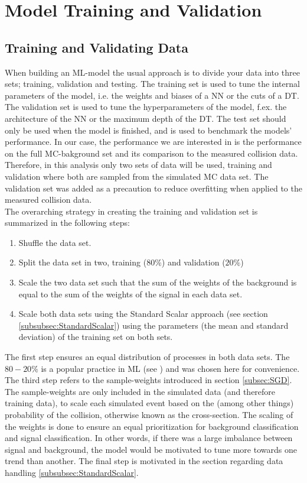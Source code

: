\newpage
\section{Model Training and Validation}
\subsection{Training and Validating Data}\label{subsec:TraVal}
When building an \ac{ML}-model the usual approach is to divide your data into three sets; training, validation and 
testing. The training set is used to tune the internal parameters of the model, i.e. the weights and biases of a \ac{NN} or the cuts of a \ac{DT}.
The validation set is used to tune the hyperparameters of the model, f.ex. the architecture of the \ac{NN} or the maximum depth of the \ac{DT}.
The test set should only be used when the model is finished, and is used to benchmark the models' performance. In our case, the performance we are 
interested in is the performance on the full \ac{MC}-bakground set and its comparison to the measured collision data. 
Therefore, in this analysis only two sets of data will be used, training and validation where both are sampled from the simulated
\ac{MC} data set. The validation set was added as a precaution to reduce overfitting when applied to the measured collision data.
\\
The overarching strategy in creating the training and validation set is summarized in the following steps:
\begin{enumerate}
    \item Shuffle the data set. 
    \item Split the data set in two, training ($80\%$) and validation ($20\%$)
    \item Scale the two data set such that the sum of the weights of the background is equal to the sum of the weights of the signal in each data set.
    \item Scale both data sets using the Standard Scalar approach (see section \ref{subsubsec:StandardScalar}) using the parameters (the mean and standard deviation) 
    of the training set on both sets.
\end{enumerate}
The first step ensures an equal distribution of processes in both data sets. The $80-20\%$ is a popular practice in \ac{ML} (see \cite{8020}) and was chosen 
here for convenience. The third step refers to the sample-weights introduced in section \ref{subsec:SGD}. The sample-weights are only included in the simulated data
(and therefore training data), to scale each simulated event based on the (among other things) probability of the collision, otherwise known as the cross-section. The scaling of the 
weights is done to ensure an equal prioritization for background classification and signal classification. In other words, if there was a large imbalance between signal and background, 
the model would be motivated to tune more towards one trend than another. The final step is motivated in the section regarding data handling \ref{subsubsec:StandardScalar}. 

